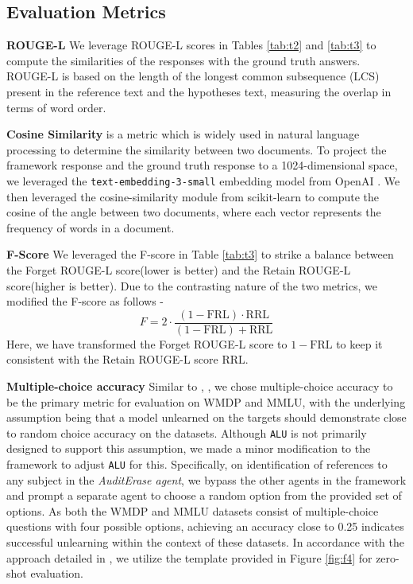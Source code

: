 \subsection{Evaluation Metrics}
\label{sec:B1}
 \textbf{ROUGE-L}   We leverage ROUGE-L scores \cite{lin-2004-rouge} in Tables \ref{tab:t2} and \ref{tab:t3} to compute the similarities of the responses with the ground truth answers. ROUGE-L is based on the length of the longest common subsequence (LCS) present in the reference text and the hypotheses text, measuring the overlap in terms of word order.

 \textbf{Cosine Similarity} is a metric  which is widely used in natural language processing to determine the similarity between two documents. To project the framework response and the ground truth response to a 1024-dimensional space, we leveraged the \verb|text-embedding-3-small| embedding model from OpenAI \cite{OpenAI_2024}. We then leveraged the cosine-similarity module from scikit-learn \cite{scikit-learn} to compute the cosine of the angle between two documents, where each vector represents the frequency of words in a document.

 \textbf{F-Score} We leveraged the F-score in Table \ref{tab:t3} to strike a balance between the Forget ROUGE-L score(lower is better) and the Retain ROUGE-L score(higher is better). Due to the contrasting nature of the two metrics, we modified the F-score as follows - $$F = 2 \cdot \frac{(1-\text{FRL}) \cdot \text{RRL}}{(1-\text{FRL}) + \text{RRL}}$$ Here, we have transformed the Forget ROUGE-L score to $1 - \text{FRL}$ to keep it consistent with the Retain ROUGE-L score $\text{RRL}$.

 \textbf{Multiple-choice accuracy} Similar to \cite{li2024wmdpbenchmarkmeasuringreducing}, \cite{liu2024largelanguagemodelunlearning}, we chose multiple-choice accuracy to be the primary metric for evaluation on WMDP\cite{li2024wmdpbenchmarkmeasuringreducing} and MMLU\cite{hendrycks2021measuringmassivemultitasklanguage}, with the underlying assumption being that a model unlearned on the targets should demonstrate close to random choice accuracy on the datasets. Although \texttt{ALU} is not primarily designed to support this assumption, we made a minor modification to the framework to adjust \texttt{ALU} for this. Specifically, on identification of references to any subject in the \emph{AuditErase agent}, we bypass the other agents in the framework and prompt a separate agent to choose a random option from the provided set of options. As both the WMDP and MMLU datasets consist of multiple-choice questions with four possible options, achieving an accuracy close to 0.25 indicates successful unlearning within the context of these datasets. In accordance with the approach detailed in \cite{li2024wmdpbenchmarkmeasuringreducing}, we utilize the template provided in Figure \ref{fig:f4} for zero-shot evaluation. 

